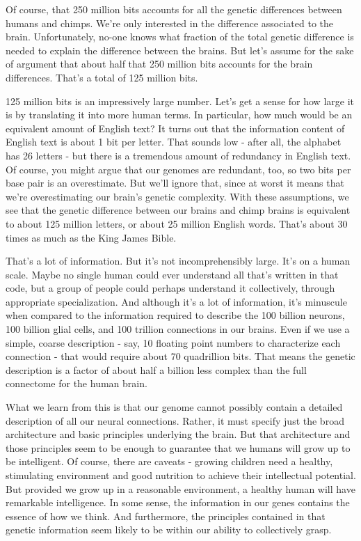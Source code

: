 Of course, that 250 million bits accounts for all the genetic differences between humans and chimps. We're only interested in the difference associated to the brain. Unfortunately, no-one knows what fraction of the total genetic difference is needed to explain the difference between the brains. But let's assume for the sake of argument that about half that 250 million bits accounts for the brain differences. That's a total of 125 million bits.

125 million bits is an impressively large number. Let's get a sense for how large it is by translating it into more human terms. In particular, how much would be an equivalent amount of English text? It turns out \cite{Shannon2005} that the information content of English text is about 1 bit per letter. That sounds low - after all, the alphabet has 26 letters - but there is a tremendous amount of redundancy in English text. Of course, you might argue that our genomes are redundant, too, so two bits per base pair is an overestimate. But we'll ignore that, since at worst it means that we're overestimating our brain's genetic complexity. With these assumptions, we see that the genetic difference between our brains and chimp brains is equivalent to about 125 million letters, or about 25 million English words. That's about 30 times as much as the King James Bible.

That's a lot of information. But it's not incomprehensibly large. It's on a human scale. Maybe no single human could ever understand all that's written in that code, but a group of people could perhaps understand it collectively, through appropriate specialization. And although it's a lot of information, it's minuscule when compared to the information required to describe the 100 billion neurons, 100 billion glial cells, and 100 trillion connections in our brains. Even if we use a simple, coarse description - say, 10 floating point numbers to characterize each connection - that would require about 70 quadrillion bits. That means the genetic description is a factor of about half a billion less complex than the full connectome for the human brain.

What we learn from this is that our genome cannot possibly contain a detailed description of all our neural connections. Rather, it must specify just the broad architecture and basic principles underlying the brain. But that architecture and those principles seem to be enough to guarantee that we humans will grow up to be intelligent. Of course, there are caveats - growing children need a healthy, stimulating environment and good nutrition to achieve their intellectual potential. But provided we grow up in a reasonable environment, a healthy human will have remarkable intelligence. In some sense, the information in our genes contains the essence of how we think. And furthermore, the principles contained in that genetic information seem likely to be within our ability to collectively grasp.

